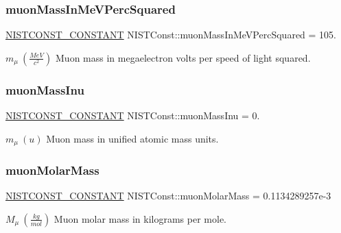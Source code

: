 \subsubsection{\texorpdfstring{muon\+Mass\+In\+Me\+V\+Perc\+Squared}{muonMassInMeVPercSquared}}
{\footnotesize\ttfamily \mbox{\hyperlink{group___n_i_s_t_const-_macros_ga2b0fc1d7452373f816175dd86ce26729}{N\+I\+S\+T\+C\+O\+N\+S\+T\+\_\+\+C\+O\+N\+S\+T\+A\+NT}} N\+I\+S\+T\+Const\+::muon\+Mass\+In\+Me\+V\+Perc\+Squared = 105.}

$m_\mu \ (\frac{MeV}{c^2})$ Muon mass in megaelectron volts per speed of light squared. \mbox{\label{group___n_i_s_t_const-_muon_gabfb491f48425292980506d140a2a98e7}} 
\subsubsection{\texorpdfstring{muon\+Mass\+Inu}{muonMassInu}}
{\footnotesize\ttfamily \mbox{\hyperlink{group___n_i_s_t_const-_macros_ga2b0fc1d7452373f816175dd86ce26729}{N\+I\+S\+T\+C\+O\+N\+S\+T\+\_\+\+C\+O\+N\+S\+T\+A\+NT}} N\+I\+S\+T\+Const\+::muon\+Mass\+Inu = 0.}

$m_\mu \ (u)$ Muon mass in unified atomic mass units. \mbox{\label{group___n_i_s_t_const-_muon_ga5954f4ab45a821dc96199dea5629b265}} 
\subsubsection{\texorpdfstring{muon\+Molar\+Mass}{muonMolarMass}}
{\footnotesize\ttfamily \mbox{\hyperlink{group___n_i_s_t_const-_macros_ga2b0fc1d7452373f816175dd86ce26729}{N\+I\+S\+T\+C\+O\+N\+S\+T\+\_\+\+C\+O\+N\+S\+T\+A\+NT}} N\+I\+S\+T\+Const\+::muon\+Molar\+Mass = 0.\+1134289257e-\/3}

$M_\mu \ (\frac{kg}{mol})$ Muon molar mass in kilograms per mole. \mbox{\label{group___n_i_s_t_const-_muon_ga8618e14187f44f64729c26685f42387d}} 

